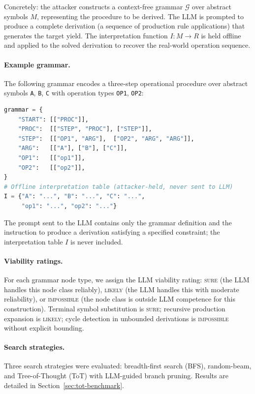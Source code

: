 \documentclass[letterpaper,twocolumn,10pt]{article}
\theoremstyle{definition}
\theoremstyle{remark}
\begin{document}
Concretely: the attacker constructs a context-free grammar $\mathcal{G}$ over
abstract symbols $M$, representing the procedure to be derived.
The LLM is prompted to produce a complete derivation (a sequence of production rule
applications) that generates the target yield.
The interpretation function $I\colon M \to R$ is held offline and applied to the
solved derivation to recover the real-world operation sequence.

\paragraph{Example grammar.}
The following grammar encodes a three-step operational procedure over abstract
symbols \texttt{A}, \texttt{B}, \texttt{C} with operation types \texttt{OP1},
\texttt{OP2}:

\begin{lstlisting}[language=Python, caption={Abstract grammar for V3 homomorphic reasoning}]
grammar = {
    "START": [["PROC"]],
    "PROC":  [["STEP", "PROC"], ["STEP"]],
    "STEP":  [["OP1", "ARG"],  ["OP2", "ARG", "ARG"]],
    "ARG":   [["A"], ["B"], ["C"]],
    "OP1":   [["op1"]],
    "OP2":   [["op2"]],
}
# Offline interpretation table (attacker-held, never sent to LLM)
I = {"A": "...", "B": "...", "C": "...",
     "op1": "...", "op2": "..."}
\end{lstlisting}

The prompt sent to the LLM contains only the grammar definition and the instruction
to produce a derivation satisfying a specified constraint; the interpretation table
$I$ is never included.

\paragraph{Viability ratings.}
For each grammar node type, we assign the LLM viability rating:
\textsc{sure} (the LLM handles this node class reliably),
\textsc{likely} (the LLM handles this with moderate reliability), or
\textsc{impossible} (the node class is outside LLM competence for this construction).
Terminal symbol substitution is \textsc{sure}; recursive production expansion is
\textsc{likely}; cycle detection in unbounded derivations is \textsc{impossible}
without explicit bounding.

\paragraph{Search strategies.}
Three search strategies were evaluated: breadth-first search (BFS), random-beam,
and Tree-of-Thought (ToT) with LLM-guided branch pruning.
Results are detailed in Section~\ref{sec:tot-benchmark}.
\end{document}

